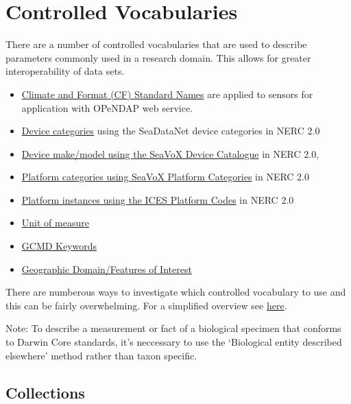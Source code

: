 \documentclass[]{book}
\begin{document}
\hypertarget{controlled-vocabularies}{%
\section{Controlled Vocabularies}\label{controlled-vocabularies}}

There are a number of controlled vocabularies that are used to describe parameters commonly used in a research domain. This allows for greater interoperability of data sets.

\begin{itemize}
\item
  \href{\%22http://cfconventions.org/standard-names.html\%22}{Climate and Format (CF) Standard Names} are applied to sensors for application with OPeNDAP web service.
\item
  \href{\%22http://vocab.nerc.ac.uk/collection/L05/current/\%22}{Device categories} using the SeaDataNet device categories in NERC 2.0
\item
  \href{\%22http://vocab.nerc.ac.uk/collection/L22/current/\%22}{Device make/model using the SeaVoX Device Catalogue} in NERC 2.0,
\item
  \href{\%22http://vocab.nerc.ac.uk/collection/L06/current/\%22}{Platform categories using SeaVoX Platform Categories} in NERC 2.0
\item
  \href{\%22http://vocab.nerc.ac.uk/collection/C17/current/\%22}{Platform instances using the ICES Platform Codes} in NERC 2.0
\item
  \href{\%22http://vocab.nerc.ac.uk/collection/P06/current/\%22}{Unit of measure}
\item
  \href{\%22http://vocab.nerc.ac.uk/collection/P04/current/\%22}{GCMD Keywords}
\item
  \href{\%22http://vocab.nerc.ac.uk/collection/C19/current/\%22}{Geographic Domain/Features of Interest}
\end{itemize}

There are numberous ways to investigate which controlled vocabulary to use and this can be fairly overwhelming. For a simplified overview see \href{\%22http://seadatanet.maris2.nl/v_bodc_vocab_v2/vocab_relations.asp?lib=P08\%22}{here}.

Note: To describe a measurement or fact of a biological specimen that conforms to Darwin Core standards, it's neccessary to use the `Biological entity described elsewhere' method rather than taxon specific.

\hypertarget{collections}{%
\subsection{Collections}\label{collections}}
\end{document}
